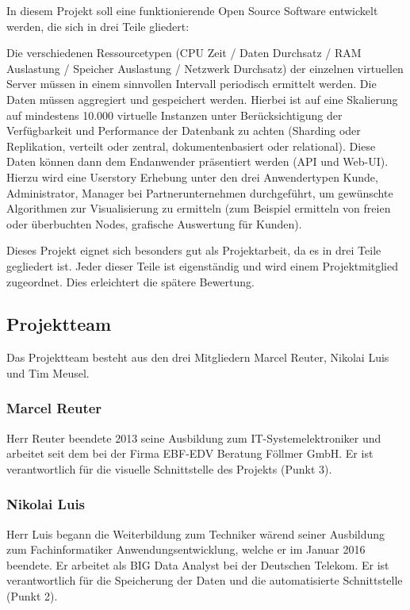 In diesem Projekt soll eine funktionierende Open Source Software entwickelt
werden, die sich in drei Teile gliedert:
\begin{outline}
  \1 Die verschiedenen Ressourcetypen (CPU Zeit / Daten Durchsatz / RAM
  Auslastung / Speicher Auslastung / Netzwerk Durchsatz) der einzelnen
  virtuellen Server müssen in einem sinnvollen Intervall periodisch ermittelt
  werden.
  \1 Die Daten müssen aggregiert und gespeichert werden. Hierbei ist auf eine
  Skalierung auf mindestens 10.000 virtuelle Instanzen unter Berücksichtigung
  der Verfügbarkeit und Performance der Datenbank zu achten (Sharding oder
  Replikation, verteilt oder zentral, dokumentenbasiert oder relational).
  \1 Diese Daten können dann dem Endanwender präsentiert werden (API und
  Web-UI). Hierzu wird eine Userstory Erhebung unter den drei Anwendertypen
  Kunde, Administrator, Manager bei Partnerunternehmen durchgeführt, um
  gewünschte Algorithmen zur Visualisierung zu ermitteln (zum Beispiel
  ermitteln von freien oder überbuchten Nodes, grafische Auswertung für Kunden).
\end{outline}

Dieses Projekt eignet sich besonders gut als Projektarbeit, da es in drei Teile
gegliedert ist. Jeder dieser Teile ist eigenständig und wird einem
Projektmitglied zugeordnet. Dies erleichtert die spätere Bewertung.
\tm%

\subsection{Projektteam}
Das Projektteam besteht aus den drei Mitgliedern Marcel Reuter, Nikolai Luis
und Tim Meusel.
\tm%

\subsubsection{Marcel Reuter}
Herr Reuter beendete 2013 seine Ausbildung zum IT-Systemelektroniker
und arbeitet seit dem bei der Firma EBF-EDV Beratung Föllmer GmbH. Er ist
verantwortlich für die visuelle Schnittstelle des Projekts (Punkt 3).
\mr%

\subsubsection{Nikolai Luis}
Herr Luis begann die Weiterbildung zum Techniker wärend seiner Ausbildung zum
Fachinformatiker Anwendungsentwicklung, welche er im Januar 2016 beendete. Er
arbeitet als BIG Data Analyst bei der Deutschen Telekom. Er ist verantwortlich
für die Speicherung der Daten und die automatisierte Schnittstelle (Punkt 2).
\nl%


